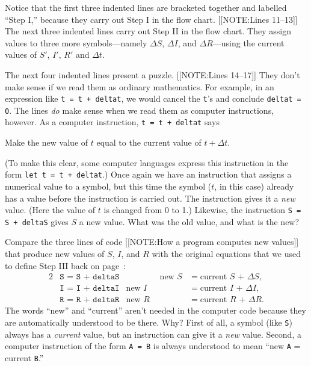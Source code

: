 Notice that the first three indented lines are bracketed together and
labelled ``Step I,'' because they carry out Step I in the flow chart.
[[NOTE:Lines 11--13]]
The next three indented lines carry out Step II in the flow chart.
They assign values to three more symbols---namely $\Delta S$, $\Delta
I$, and $\Delta R$---using the current values of $S'$, $I'$, $R'$ and
$\Delta t$.

The next four indented lines present a puzzle.  
[[NOTE:Lines 14--17]]
They don't make sense if we read them as ordinary mathematics.  For
example, in an expression like \mbox{\texttt{t = t + deltat}}, we would cancel
the {\tt t}'s and conclude {\tt deltat = 0}.  The lines {\em do\/}
make sense when we read them as computer instructions, however.  As a
computer instruction, {\tt t = t + deltat} says
\begin{center}
Make the new value of $t$ equal to the current value of $t + \Delta t$.
\end{center}
(To make this clear, some computer languages express this instruction
in the form {\tt let t = t + deltat}.)  Once again we have an
instruction that assigns a numerical value to a symbol, but this time
the symbol ($t$, in this case) already has a value before the
instruction is carried out.  The instruction gives it a {\em new\/}
value.  (Here the value of $t$ is changed from 0 to 1.)  Likewise, the
instruction {\tt S = S + deltaS} gives $S$ a new value.  What was the
old value, and what is the new?

Compare the three lines of code 
[[NOTE:How a program computes new values]]
that produce new values of $S$, $I$, and $R$ with the original
equations that we used to define Step III back on
page~\pageref{`flowchart'}:
\begin{alignat*}{2}
&\texttt{S = S + deltaS} &\qquad\qquad  \text{new $S$} &= 
           \text{current $S$ + $\Delta S$}, \\
&\texttt{I = I + deltaI} &              \text{new $I$} &= 
           \text{current $I$ + $\Delta I$}, \\
&\texttt{R = R + deltaR} &              \text{new $R$} &= 
           \text{current $R$ + $\Delta R$}. 
\end{alignat*}
The words ``new'' and ``current'' aren't needed in the computer code
because they are automatically understood to be there.  Why?  First of
all, a symbol (like {\tt S}) always has a {\em current\/} value, but
an instruction can give it a {\em new\/} value.  Second, a computer
instruction of the form {\tt A = B} is always understood to mean ``new
{\tt A} = current {\tt B}.''


